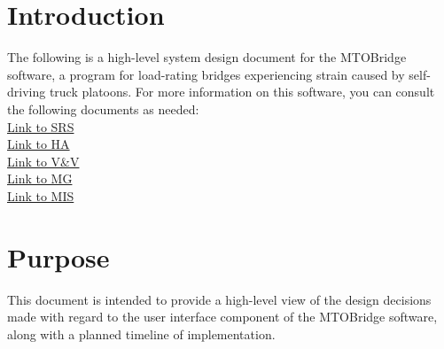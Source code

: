 \documentclass[12pt, titlepage]{article}
\begin{document}
\newpage

\tableofcontents

\newpage

\listoftables

\listoffigures

\newpage


\section{Introduction}
The following is a high-level system design document for the MTOBridge software, a program for load-rating bridges experiencing strain caused by self-driving truck platoons. For more information on this software, you can consult the following documents as needed:\\
\href{../../SRS/SRS.pdf}{Link to SRS}\\
\href{../../HazardAnalysis/HazardAnalysis.pdf}{Link to HA}\\
\href{../../VnVPlan/VnVPlan.pdf}{Link to V\&V}\\
\href{../../Design/SoftArchitecture/MG.pdf}{Link to MG}\\
\href{../../Design/SystDesign/SystDes.pdf}{Link to MIS}

\section{Purpose}
This document is intended to provide a high-level view of the design decisions made with regard to the user interface component of the MTOBridge software, along with a planned timeline of implementation.
\end{document}
